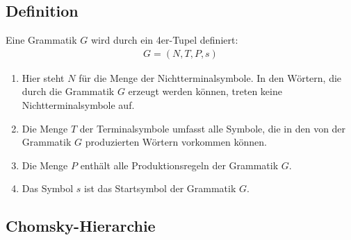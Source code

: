 \subsection{Definition}
\begin{flushleft}
Eine Grammatik $G$ wird durch ein 4er-Tupel definiert:
\begin{align}
    G=\left(N,T,P,s\right)
\end{align}

\begin{enumerate}
    \item {
        Hier steht $N$ für die Menge der Nichtterminalsymbole.
        In den Wörtern, die durch die Grammatik $G$ erzeugt werden
        können, treten keine Nichtterminalsymbole auf.
    }
    \item {
        Die Menge $T$ der Terminalsymbole umfasst alle Symbole, die
        in den von der Grammatik $G$ produzierten Wörtern vorkommen können.
    }
    \item {
        Die Menge $P$ enthält alle Produktionsregeln der Grammatik $G$.
    }
    \item {
        Das Symbol $s$ ist das Startsymbol der Grammatik $G$.
    }
\end{enumerate}
\end{flushleft}

\subsection{Chomsky-Hierarchie}
\begin{center}
\end{center}

